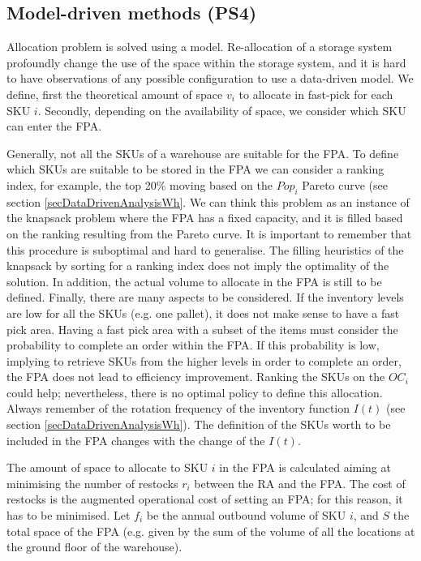 \subsection{Model-driven methods (PS4)}
Allocation problem is solved using a model. Re-allocation of a storage system profoundly change the use of the space within the storage system, and it is hard to have observations of any possible configuration to use a data-driven model. We define, first the theoretical amount of space $v_i$ to allocate in fast-pick for each SKU $i$. Secondly, depending on the availability of space, we consider which SKU can enter the FPA. \par

Generally, not all the SKUs of a warehouse are suitable for the FPA. To define which SKUs are suitable to be stored in the FPA we can consider a ranking index, for example, the top 20\% moving based on the $Pop_i$ Pareto curve (see section \ref{secDataDrivenAnalysisWh}. We can think this problem as an instance of the knapsack problem where the FPA has a fixed capacity, and it is filled based on the ranking resulting from the Pareto curve. It is important to remember that this procedure is suboptimal and hard to generalise. The filling heuristics of the knapsack by sorting for a ranking index does not imply the optimality of the solution. In addition, the actual volume to allocate in the FPA is still to be defined. Finally, there are many aspects to be considered. If the inventory levels are low for all the SKUs (e.g. one pallet), it does not make sense to have a fast pick area. Having a fast pick area with a subset of the items must consider the probability to complete an order within the FPA. If this probability is low, implying to retrieve SKUs from the higher levels in order to complete an order, the FPA does not lead to efficiency improvement. Ranking the SKUs on the $OC_i$ could help; nevertheless, there is no optimal policy to define this allocation. Always remember of the rotation frequency of the inventory function $I(t)$ (see section \ref{secDataDrivenAnalysisWh}). The definition of the SKUs worth to be included in the FPA changes with the change of the $I(t)$. \par

The amount of space to allocate to SKU $i$ in the FPA is calculated aiming at minimising the number of restocks $r_i$ between the RA and the FPA. The cost of restocks is the augmented operational cost of setting an FPA; for this reason, it has to be minimised. Let $f_i$ be the annual outbound volume of SKU $i$, and $S$ the total space of the FPA (e.g. given by the sum of the volume of all the locations at the ground floor of the warehouse).\par

